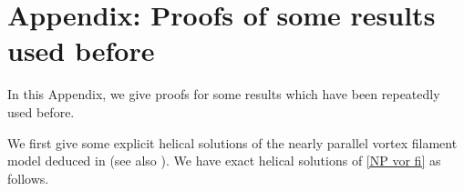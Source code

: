 \documentclass[12pt,reqno]{amsart}
\numberwithin{equation}{section}
\theoremstyle{definition}
\theoremstyle{remark}
\begin{document}
\fi








 
\setcounter{equation}{0}\renewcommand{}
\section{Appendix: Proofs of some results used before}
In this Appendix, we give proofs for some results  which have been repeatedly used before. %

We first give some explicit helical solutions of  the nearly parallel vortex filament model deduced in \cite{KMD} (see also \cite{GM2}). %
We have  exact helical solutions of  \eqref{NP vor fi} as follows.
\end{document}
